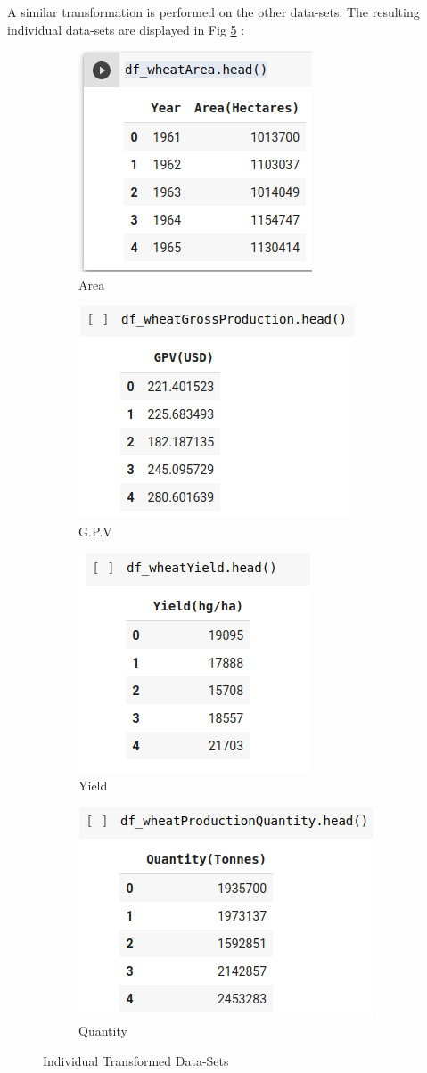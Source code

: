 A similar transformation is performed on the other data-sets. The resulting individual data-sets are displayed in Fig \ref{fig:heads} : 
\begin{figure}
	\centering
	\begin{subfigure}{.25\textwidth}
		\centering
		\includegraphics[width=.4\linewidth]{fig/areaHectares.png}
		\caption{Area}
		\label{fig:sub1}
	\end{subfigure}%
	\begin{subfigure}{.24\textwidth}
		\centering
		\includegraphics[width=.4\linewidth]{fig/gpv.png}
		\caption{G.P.V}
		\label{fig:sub2}
	\end{subfigure}
	\begin{subfigure}{.25\textwidth}
		\centering
		\includegraphics[width=.4\linewidth]{fig/yield.png}
		\caption{Yield}
		\label{fig:sub3}
	\end{subfigure}
	\begin{subfigure}{.24\textwidth}
		\centering
		\includegraphics[width=.4\linewidth]{fig/quantityTonnes.png}
		\caption{Quantity}
		\label{fig:sub4}
	\end{subfigure}

	\caption{Individual Transformed Data-Sets}
	\label{fig:heads}
\end{figure}



